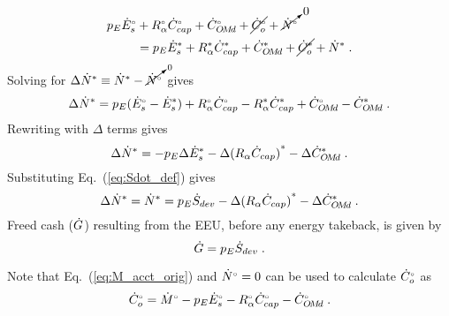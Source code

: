 \begin{landscape}
{\begin{align}
  p_E {}{\dot{E}}^{\scriptscriptstyle \circ}_s &+ {}{R}^{\scriptscriptstyle \circ}_\alpha {}{\dot{C}}^{\scriptscriptstyle \circ}_{cap} + {}{\dot{C}}^{\scriptscriptstyle \circ}_{O\!M\!d} + \cancel{{}{\dot{C}}^{\scriptscriptstyle \circ}_o} + \cancelto{0}{{}{\dot{N}}^{\scriptscriptstyle \circ}} \nonumber \\
                   &= p_E {\dot{E}}^*_s + {R}^*_\alpha {\dot{C}}^*_{cap} + {\dot{C}}^*_{O\!M\!d} + \cancel{{\dot{C}}^*_o}  + {\dot{N}}^* \; .
\end{align}
%
Solving for $\Delta {\dot{N}}^* \equiv {\dot{N}}^* - \cancelto{0}{{}{\dot{N}}^{\scriptscriptstyle \circ}}$ gives 
%
\begin{equation}
  \Delta {\dot{N}}^* = p_E({}{\dot{E}}^{\scriptscriptstyle \circ}_s - {\dot{E}}^*_s) 
                      + {}{R}^{\scriptscriptstyle \circ}_\alpha {}{\dot{C}}^{\scriptscriptstyle \circ}_{cap} - {R}^*_\alpha {\dot{C}}^*_{cap}
                      + {}{\dot{C}}^{\scriptscriptstyle \circ}_{O\!M\!d} - {\dot{C}}^*_{O\!M\!d} \; .
\end{equation}
%
Rewriting with $\Delta$ terms gives
%
\begin{equation}
  \Delta {\dot{N}}^* = - p_E \Delta {\dot{E}}^*_s - \Delta {(R_\alpha \dot{C}_{cap})}^* - \Delta {\dot{C}}^*_{O\!M\!d} \; .
\end{equation}
%
Substituting Eq.~(\ref{eq:Sdot_def}) gives
%
\begin{equation} \label{eq:N_dot_star_empl}
  \Delta {\dot{N}}^* = {\dot{N}}^* = p_E \dot{S}_{dev} - \Delta {(R_\alpha \dot{C}_{cap})}^* - \Delta {\dot{C}}^*_{O\!M\!d} \; .
\end{equation}
%
Freed cash ($\dot{G}$) resulting from the EEU, 
before any energy takeback, is given by 
%
\begin{equation} \label{eq:G_dot}
  \dot{G} = p_E \dot{S}_{dev} \; .
\end{equation}

Note that Eq.~(\ref{eq:M_acct_orig}) and ${}{\dot{N}}^{\scriptscriptstyle \circ} = 0$ can be used to calculate ${}{\dot{C}}^{\scriptscriptstyle \circ}_o$ as
%
\begin{equation} \label{eq:C_dot_o}
  {}{\dot{C}}^{\scriptscriptstyle \circ}_o = {}{\dot{M}}^{\scriptscriptstyle \circ} - p_E {}{\dot{E}}^{\scriptscriptstyle \circ}_s - {}{R}^{\scriptscriptstyle \circ}_\alpha {}{\dot{C}}^{\scriptscriptstyle \circ}_{cap} - {}{\dot{C}}^{\scriptscriptstyle \circ}_{O\!M\!d} \; .
\end{equation}
%

}
\end{landscape}
